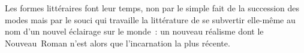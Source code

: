 \documentclass[12pt, a4paper]{article}
\begin{document}
Les formes littéraires font leur temps, non par le simple fait de la succession des modes mais par le souci qui travaille la littérature de se subvertir elle-même au nom d'un nouvel éclairage sur le monde~: un nouveau réalisme dont le Nouveau~Roman n'est alors que l'incarnation la plus récente.
\end{document}
